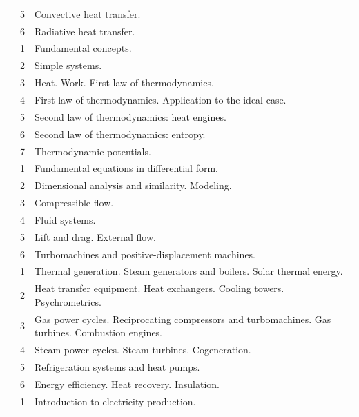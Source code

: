 \documentclass[11pt]{article}
\begin{document}
{\begin{xltabular}{\textwidth}{@{}>{\raggedright\arraybackslash}p{5.0cm}r>{\raggedright\arraybackslash}X@{}}
 & 5 & Convective heat transfer. \\*
 & 6 & Radiative heat transfer. \\
\midrule
{} & 1 & Fundamental concepts. \\*
 & 2 & Simple systems. \\*
 & 3 & Heat. Work. First law of thermodynamics. \\*
 & 4 & First law of thermodynamics. Application to the ideal case. \\*
 & 5 & Second law of thermodynamics: heat engines. \\*
 & 6 & Second law of thermodynamics: entropy. \\*
 & 7 & Thermodynamic potentials. \\
\midrule
{} & 1 & Fundamental equations in differential form. \\*
 & 2 & Dimensional analysis and similarity. Modeling. \\*
 & 3 & Compressible flow. \\*
 & 4 & Fluid systems. \\*
 & 5 & Lift and drag. External flow. \\*
 & 6 & Turbomachines and positive-displacement machines. \\
\midrule
{} & 1 & Thermal generation. Steam generators and boilers. Solar thermal energy. \\*
 & 2 & Heat transfer equipment. Heat exchangers. Cooling towers. Psychrometrics. \\*
 & 3 & Gas power cycles. Reciprocating compressors and turbomachines. Gas turbines. Combustion engines. \\*
 & 4 & Steam power cycles. Steam turbines. Cogeneration. \\*
 & 5 & Refrigeration systems and heat pumps. \\*
 & 6 & Energy efficiency. Heat recovery. Insulation. \\
\midrule
{} & 1 & Introduction to electricity production. \\*

\end{xltabular}}
\end{document}
